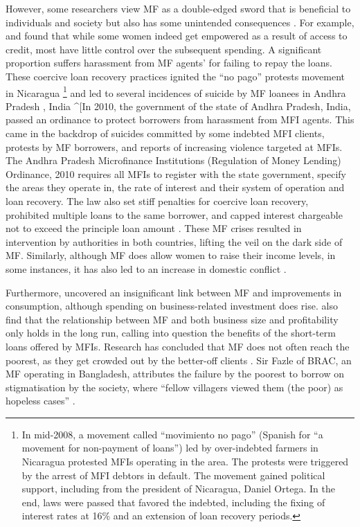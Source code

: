 \documentclass[a4paper, nobind]{templates/ociamthesis}
\begin{document}
However, some researchers view MF as a double-edged sword that is beneficial to individuals and society but also has some unintended consequences \autocite{ganle2015microcredit,van2012impact}. For example, \textcite{ganle2015microcredit} and \textcite{van2012impact} found that while some women indeed get empowered as a result of access to credit, most have little control over the subsequent spending. A significant proportion suffers harassment from MF agents' for failing to repay the loans. These coercive loan recovery practices ignited the ``no pago'' protests movement in Nicaragua \footnote{In mid-2008, a movement called ``movimiento no pago'' (Spanish for ``a movement for non-payment of loans'') led by over-indebted farmers in Nicaragua protested MFIs operating in the area. The protests were triggered by the arrest of MFI debtors in default. The movement gained political support, including from the president of Nicaragua, Daniel Ortega. In the end, laws were passed that favored the indebted, including the fixing of interest rates at 16\% and an extension of loan recovery periods.} and led to several incidences of suicide by MF loanees in Andhra Pradesh , India \^{}{[}In 2010, the government of the state of Andhra Pradesh, India, passed an ordinance to protect borrowers from harassment from MFI agents. This came in the backdrop of suicides committed by some indebted MFI clients, protests by MF borrowers, and reports of increasing violence targeted at MFIs. The Andhra Pradesh Microfinance Institutions (Regulation of Money Lending) Ordinance, 2010 requires all MFIs to register with the state government, specify the areas they operate in, the rate of interest and their system of operation and loan recovery. The law also set stiff penalties for coercive loan recovery, prohibited multiple loans to the same borrower, and capped interest chargeable not to exceed the principle loan amount \autocite{ghosh2013microfinance,bastiaensen2013after,wright2016rebuilding}. These MF crises resulted in intervention by authorities in both countries, lifting the veil on the dark side of MF. Similarly, although MF does allow women to raise their income levels, in some instances, it has also led to an increase in domestic conflict \autocite{salia2018women}.

Furthermore, \textcite{newman2017microfinance} uncovered an insignificant link between MF and improvements in consumption, although spending on business-related investment does rise. \textcite{shahriar2017lender} also find that the relationship between MF and both business size and profitability only holds in the long run, calling into question the benefits of the short-term loans offered by MFIs. Research has concluded that MF does not often reach the poorest, as they get crowded out by the better-off clients \autocite{abeysekera2014sustainability}. Sir Fazle of BRAC, an MF operating in Bangladesh, attributes the failure by the poorest to borrow on stigmatisation by the society, where ``fellow villagers viewed them (the poor) as hopeless cases'' \autocite{zulfiqar2017kashf}.
\end{document}
